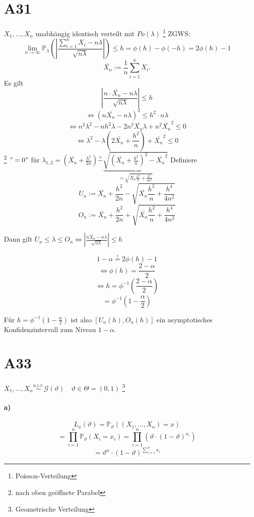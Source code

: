 \documentclass[a4paper,11pt,notitlepage]{report}
\newcommand{\Prim}{{\ensuremath{\mathbb{P}}}}
\begin{document}
 \section{A31}
 $X_1, \ldots, X_n$ unabhängig identisch verteilt mit $Po(\lambda)$ \footnote{Poisson-Verteilung}
 \newline
 ZGWS:
 $$\lim\limits_{n \rightarrow \infty}{\Prim_\lambda(\left|\frac{\sum\limits_{i=1}^n{X_i} - n \lambda}{\sqrt{n \lambda}}\right|) \leq h} = \phi(h) - \phi(-h) = 2 \phi(h)-1$$
 $$\bar{X_n} := \frac{1}{n} \sum\limits_{i=1}^n{X_i}.$$
 Es gilt
 $$\left | \frac{n \cdot \bar{X_n} - n \lambda}{\sqrt {n \lambda}}  \right | \leq h$$
 $$\Leftrightarrow (n \bar{X_n} - n \lambda)^2 \leq h^2 \cdot n \lambda$$
 $$\Leftrightarrow n^2 \lambda^2 - n h^2 \lambda - 2 n^2 \bar{X_n} \lambda + n^2 \bar{X_n}^2 \leq 0$$
 $$\Leftrightarrow \lambda^2 - \lambda (2 \bar{X_n} + \frac{h^2}{n}) + \bar{X_n}^2 \leq 0$$ \footnote{nach oben geöffnete Parabel}
 $"=0"$ für $\lambda_{1,2} = (\bar{X_n} + \frac{h^2}{2n}) \overset{+}{-} \underbrace{\sqrt{(\bar{X_n} + \frac{h^2}{n})^2 - \bar{X_n}^2}}_{= \sqrt{\bar{X_n} \frac{h^2}{n} + \frac{h^4}{4n^2}}}$ \newline
 Definiere
 $$U_n := \bar{X_n} + \frac{h^2}{2n} - \sqrt{\bar{X_n} \frac{h^2}{n} + \frac{h^4}{4n^2}}$$
 $$O_n := \bar{X_n} + \frac{h^2}{2n} + \sqrt{\bar{X_n} \frac{h^2}{n} + \frac{h^4}{4n^2}}$$
 
 Dann gilt $U_n \leq \lambda \leq O_n \Leftrightarrow \left | \frac{n \bar{X_n} - n \lambda}{\sqrt{n \lambda}} \right | \leq h$
 
 $$1-\alpha \overset{!}{=} 2 \phi(h)-1$$
 $$\Leftrightarrow \phi(h) = \frac{2-\alpha}{2}$$
 $$\Leftrightarrow h = \phi^{-1}(\frac{2-\alpha}{2})$$
 $$= \phi^{-1}(1-\frac{\alpha}{2})$$
 
 Für $h = \phi^{-1}(1-\frac{\alpha}{2})$ ist also $[U_n(h), O_n(h)]$ ein asymptotisches Konfidenzintervall zum Niveau $1 - \alpha$.
 
 \section{A33}
 $X_1, \ldots, X_n \overset{u.i.v.}{\sim} \mathcal{G}(\vartheta) \quad \vartheta \in \Theta= (0,1)$ \footnote{Geometrische Verteilung}
 
 \paragraph{a)}
 $$L_x(\vartheta) = \Prim_\vartheta((X_1, \ldots, X_n) = x)$$
 $$= \prod\limits_{i=1}^n{\Prim_\vartheta(X_i = x_i)} = \prod\limits_{i=1}^n{(\vartheta \cdot (1-\vartheta)^{x_i})}$$
 $$= \vartheta^n \cdot (1-\vartheta)^{\sum\limits_{i=1}^n{x_i}}$$
 
\end{document}
